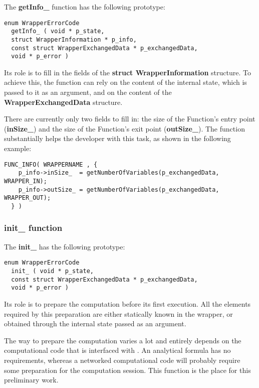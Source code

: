 The {\bf getInfo\_} function has the following prototype:

\lstset{language=C++, basicstyle=\normalsize}
\begin{lstlisting}[frame=TBRL]
  enum WrapperErrorCode
  getInfo_ ( void * p_state,
  struct WrapperInformation * p_info,
  const struct WrapperExchangedData * p_exchangedData,
  void * p_error )
\end{lstlisting}

Its role is to fill in the fields of the {\bf struct WrapperInformation} structure. To achieve this, the function can rely on the content of the internal state, which is passed to it as an argument, and on the content of the {\bf WrapperExchangedData} structure.

There are currently only two fields to fill in: the size of the Function's entry point ({\bf inSize\_}) and the size of the Function's exit point ({\bf outSize\_}). The  function substantially helps the developer with this task, as shown in the following example:

\lstset{language=C++, basicstyle=\normalsize}
\begin{lstlisting}[frame=TBRL]
  FUNC_INFO( WRAPPERNAME , {
    p_info->inSize_  = getNumberOfVariables(p_exchangedData, WRAPPER_IN);
    p_info->outSize_ = getNumberOfVariables(p_exchangedData, WRAPPER_OUT);
  } )
\end{lstlisting}


\subsubsection{init\_ function}

The {\bf init\_} has the following prototype:

\lstset{language=C++, basicstyle=\normalsize}
\begin{lstlisting}[frame=TBRL]
  enum WrapperErrorCode
  init_ ( void * p_state,
  const struct WrapperExchangedData * p_exchangedData,
  void * p_error )
\end{lstlisting}

Its role is to prepare the computation before its first execution. All the elements required by this preparation are either statically known in the wrapper, or obtained through the internal state passed as an argument.

The way to prepare the computation varies a lot and entirely depends on the computational code that is interfaced with \OT . An analytical formula has no requirements, whereas a networked computational code will probably require some preparation for the computation session. This function is the place for this preliminary work.

